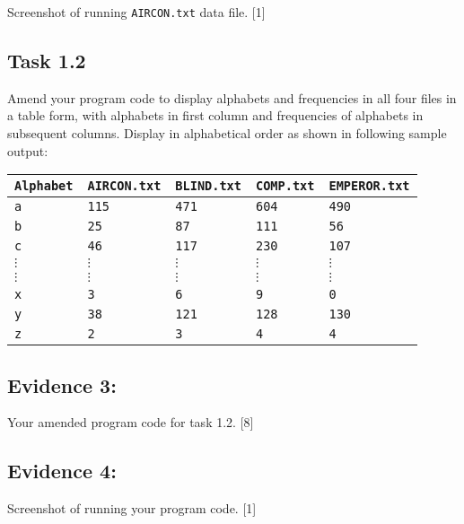 Screenshot of running \texttt{AIRCON.txt} data file.\hfill{} {[}1{]}

\subsection*{Task 1.2 }

Amend your program code to display alphabets and frequencies in all
four files in a table form, with alphabets in first column and frequencies
of alphabets in subsequent columns. Display in alphabetical order
as shown in following sample output: 
\noindent \begin{center}
\begin{tabular}{|l|l|l|l|l|}
\hline 
\texttt{Alphabet} & \texttt{AIRCON.txt} & \texttt{BLIND.txt} & \texttt{COMP.txt} & \texttt{EMPEROR.txt}\tabularnewline
\hline 
\texttt{a} & \texttt{115} & \texttt{471} & \texttt{604} & \texttt{490}\tabularnewline
\hline 
\texttt{b} & \texttt{25} & \texttt{87} & \texttt{111} & \texttt{56}\tabularnewline
\hline 
\texttt{c} & \texttt{46} & \texttt{117} & \texttt{230} & \texttt{107}\tabularnewline
\hline 
\texttt{$\vdots$} & \texttt{$\vdots$} & \texttt{$\vdots$} & \texttt{$\vdots$} & \texttt{$\vdots$}\tabularnewline
\hline 
\texttt{$\vdots$} & \texttt{$\vdots$} & \texttt{$\vdots$} & \texttt{$\vdots$} & \texttt{$\vdots$}\tabularnewline
\hline 
\texttt{x} & \texttt{3} & \texttt{6} & \texttt{9} & \texttt{0}\tabularnewline
\hline 
\texttt{y} & \texttt{38} & \texttt{121} & \texttt{128} & \texttt{130}\tabularnewline
\hline 
\texttt{z} & \texttt{2} & \texttt{3} & \texttt{4} & \texttt{4}\tabularnewline
\hline 
\end{tabular}
\par\end{center}

\subsection*{Evidence 3: }

Your amended program code for task 1.2. \hfill{}{[}8{]}

\subsection*{Evidence 4: }

Screenshot of running your program code.\hfill{} {[}1{]}